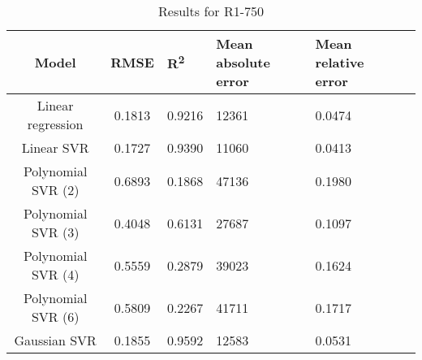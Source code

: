 \begin{table}[H]
\centering
\begin{adjustbox}{center}
\begin{tabular}{c | c M{1.2cm} M{2.5cm} M{2.5cm} M{1.8cm}}
Model & RMSE & R\textsuperscript{2} & Mean absolute error & Mean relative error \tabularnewline
\hline
Linear regression & 0.1813 & 0.9216 &  12361 & 0.0474 \\
Linear SVR & 0.1727 & 0.9390 &  11060 & 0.0413 \\
Polynomial SVR (2) & 0.6893 & 0.1868 &  47136 & 0.1980 \\
Polynomial SVR (3) & 0.4048 & 0.6131 &  27687 & 0.1097 \\
Polynomial SVR (4) & 0.5559 & 0.2879 &  39023 & 0.1624 \\
Polynomial SVR (6) & 0.5809 & 0.2267 &  41711 & 0.1717 \\
Gaussian SVR & 0.1855 & 0.9592 &  12583 & 0.0531 \\
\end{tabular}
\end{adjustbox}
\\
\caption{Results for R1-750}
\label{tab:coreonly_linear_R1_750}
\end{table}

